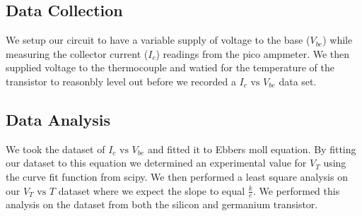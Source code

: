\documentclass[12pt,letterpaper,twocolumn]{article}
\begin{document}

\subsection{Data Collection}
We setup our circuit to have a variable supply of voltage to the base ($V_{be}$) while measuring the collector current ($I_c$) readings from the pico ampmeter.
We then supplied voltage to the thermocouple and watied for the temperature of the transistor to reasonbly level out before we recorded a $I_c \text{ vs } V_{be}$ data set.




\subsection{Data Analysis}
We took the dataset of $I_c \text{ vs }V_{be}$ and fitted it to Ebbers moll equation.
By fitting our dataset to this equation we determined an experimental value for $V_T$ using the curve fit function from scipy.
We then performed a least square analysis on our $V_T \text{ vs } T$ dataset where we expect the slope to equal $\frac{k}{e}$. We performed this analysis on the dataset from both the silicon and germanium transistor. 
\end{document}
